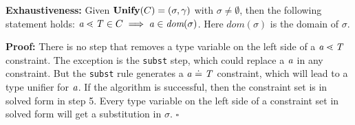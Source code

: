 \begin{lemma}\label{lemma:unify-exhaustive}
  \textbf{Exhaustiveness:}
  Given $\textbf{Unify}{}(C) = (\sigma, \gamma{})$ with $\sigma \neq \emptyset$,
  then the following statement holds:
  $\mathit{ a } \lessdot \mathit{T} \in C \implies \mathit{ a } \in \textit{dom}(\sigma)$.
  Here $\textit{dom}(\sigma)$ is the domain of $\sigma$.
\end{lemma} %
\textbf{Proof:}
There is no step that removes a type variable on the left side of a $\mathit{ a } \lessdot \mathit{T}$ constraint.
The exception is the \texttt{subst} step, which could replace a $\mathit{ a }$ in any constraint.
But the \texttt{subst} rule generates a $\mathit{ a } \doteq \mathit{T}$ constraint, which will lead to a type unifier for $\mathit{ a }$.
If the \unify{} algorithm is successful, then the constraint set is in solved form in step 5.
Every type variable on the left side of a constraint set in solved form will get a substitution in $\sigma$.
\hfill $\square$
\fi